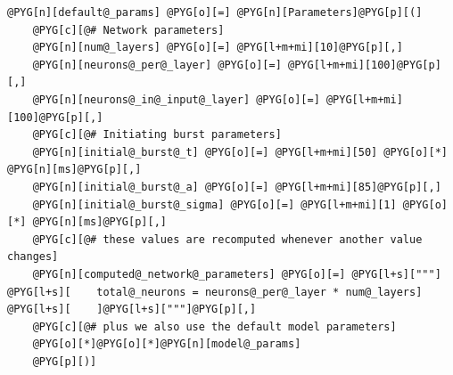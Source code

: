 \documentclass[letterpaper,10pt,english]{manual}
\begin{document}
\begin{Verbatim}[commandchars=@\[\]]
@PYG[n][default@_params] @PYG[o][=] @PYG[n][Parameters]@PYG[p][(]
    @PYG[c][@# Network parameters]
    @PYG[n][num@_layers] @PYG[o][=] @PYG[l+m+mi][10]@PYG[p][,]
    @PYG[n][neurons@_per@_layer] @PYG[o][=] @PYG[l+m+mi][100]@PYG[p][,]
    @PYG[n][neurons@_in@_input@_layer] @PYG[o][=] @PYG[l+m+mi][100]@PYG[p][,]
    @PYG[c][@# Initiating burst parameters]
    @PYG[n][initial@_burst@_t] @PYG[o][=] @PYG[l+m+mi][50] @PYG[o][*] @PYG[n][ms]@PYG[p][,]
    @PYG[n][initial@_burst@_a] @PYG[o][=] @PYG[l+m+mi][85]@PYG[p][,]
    @PYG[n][initial@_burst@_sigma] @PYG[o][=] @PYG[l+m+mi][1] @PYG[o][*] @PYG[n][ms]@PYG[p][,]
    @PYG[c][@# these values are recomputed whenever another value changes]
    @PYG[n][computed@_network@_parameters] @PYG[o][=] @PYG[l+s]["""]
@PYG[l+s][    total@_neurons = neurons@_per@_layer * num@_layers]
@PYG[l+s][    ]@PYG[l+s]["""]@PYG[p][,]
    @PYG[c][@# plus we also use the default model parameters]
    @PYG[o][*]@PYG[o][*]@PYG[n][model@_params]
    @PYG[p][)]


\end{Verbatim}
\end{document}
